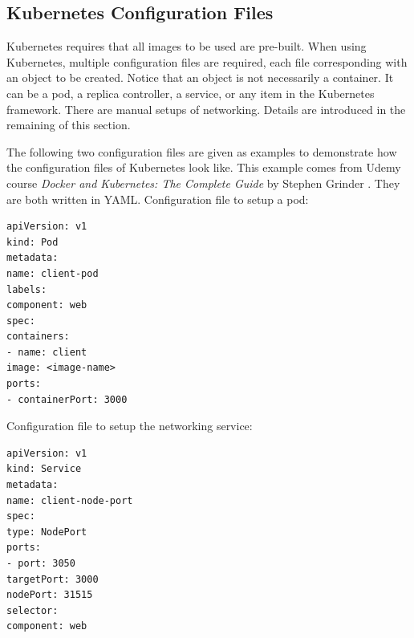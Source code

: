 \subsection{Kubernetes Configuration Files}

Kubernetes requires that all images to be used are pre-built. When using Kubernetes, multiple configuration files are required, each file corresponding with an object to be created. Notice that an object is not necessarily a container. It can be a pod, a replica controller, a service, or any item in the Kubernetes framework. There are manual setups of networking. Details are introduced in the remaining of this section.

The following two configuration files are given as examples to demonstrate how the configuration files of Kubernetes look like. This example comes from Udemy course \textit{Docker and Kubernetes: The Complete Guide} by Stephen Grinder \cite{stephen2023docker}. They are both written in YAML. Configuration file to setup a pod:
\begin{lstlisting}
apiVersion: v1
kind: Pod
metadata:
name: client-pod
labels:
component: web
spec:
containers:
- name: client
image: <image-name>
ports:
- containerPort: 3000
\end{lstlisting}
Configuration file to setup the networking service:
\begin{lstlisting}
apiVersion: v1
kind: Service
metadata:
name: client-node-port
spec:
type: NodePort
ports:
- port: 3050
targetPort: 3000
nodePort: 31515
selector:
component: web
\end{lstlisting}


